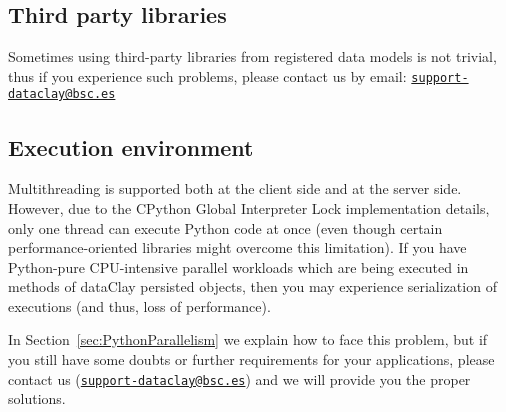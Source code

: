 \subsection{Third party libraries}

Sometimes using third-party libraries from registered data models is not trivial, thus if you experience such problems, please contact us by email: \texttt{\href{mailto:support-dataclay@bsc.es}{support-dataclay@bsc.es}}

\subsection{Execution environment}
\label{sec:PythonConsiderationsExecutionEnvironment}

Multithreading is supported both at the client side and at the server side. However, due to the CPython Global Interpreter Lock implementation details, only one thread can execute Python code at once (even though certain performance-oriented libraries might overcome this limitation). If you have Python-pure CPU-intensive parallel workloads which are being executed in methods of dataClay persisted objects, then you may experience serialization of executions (and thus, loss of performance).

In Section~\ref{sec:PythonParallelism} we explain how to face this problem, but if you still have some doubts or further requirements for your applications, please contact us (\texttt{\href{mailto:support-dataclay@bsc.es}{support-dataclay@bsc.es}}) and we will provide you the proper solutions.

\FEDERATION{

}
